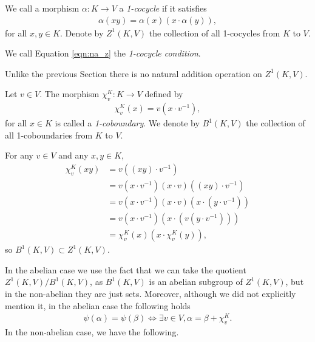 \begin{definition} We call a morphism $\alpha:K\rightarrow V$ a \emph{1-cocycle} if it satisfies
\begin{align}
  \alpha(xy) = \alpha(x) (x\cdot\alpha(y)),
  \label{eqn:na_z}
\end{align}
for all $x, y \in K$. Denote by $Z^1\left( K, V \right)$ the collection of all 1-cocycles from $K$ to $V$.

We call Equation \ref{eqn:na_z} the \emph{1-cocycle condition}.
\end{definition}

\begin{remark} Unlike the previous Section there is no natural addition operation on $Z^1(K, V)$.
\end{remark}

\begin{definition} Let $v \in V$. The morphism $\chi^K_v:K\rightarrow V$ defined by
\begin{align*}
	\chi^K_v (x) = v (x\cdot v^{-1}),
\end{align*}
for all $x \in K$ is called a \emph{1-coboundary}. We denote by $B^1\left(K, V\right)$ the collection of all 1-coboundaries from $K$ to $V$.
\end{definition}

For any $v \in V$ and any $x, y \in K$,
\begin{align*}
	\chi^K_v(xy) &=  v \left((xy) \cdot v^{-1}\right) \\
	&=  v (x \cdot v^{-1}) (x \cdot v) ((xy) \cdot v^{-1}) \\
	&=  v \left(x \cdot v^{-1}\right) (x \cdot v) \left(x \cdot \left(y \cdot v^{-1}\right)\right) \\
	&=  v \left(x \cdot v^{-1}\right) \left(x \cdot \left( v \left(y \cdot v^{-1}\right)\right)\right) \\
	&=  \chi^K_v(x) (x \cdot \chi^K_v(y)),
\end{align*}
so $B^1(K, V) \subset Z^1(K, V)$.

In the abelian case we use the fact that we can take the quotient $Z^1(K, V)/B^1(K, V)$, as $B^1(K, V)$ is an abelian subgroup of $Z^1(K, V)$, but in the non-abelian they are just sets. Moreover, although we did not explicitly mention it, in the abelian case the following holds
\begin{align*}
	\psi(\alpha) = \psi(\beta) \Leftrightarrow \exists v \in V, \alpha = \beta + \chi^K_v.
\end{align*}
In the non-abelian case, we have the following.

